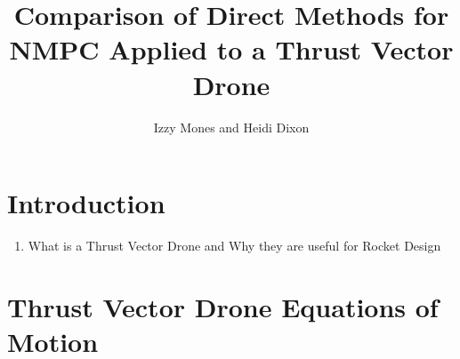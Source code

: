 \documentclass[]{article}
\title{Comparison of Direct Methods for NMPC  Applied to  a Thrust Vector Drone}
\author{Izzy Mones and Heidi Dixon}
\begin{document}
	\maketitle
	
	\section*{Introduction}	
	\begin{enumerate}
		\item What is a Thrust Vector Drone and Why they are useful for Rocket Design
	\end{enumerate}
	

	
	\section*{Thrust Vector Drone Equations of Motion}
	
\end{document}
